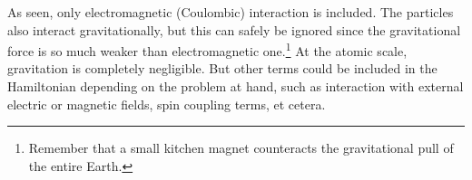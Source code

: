 \documentclass[11pt,bibliography=totoc,index=totoc]{scrbook}   %
\begin{document}
As seen, only electromagnetic (Coulombic) interaction is included. 
The particles also interact gravitationally, but this can safely be ignored since the gravitational force is so much weaker than electromagnetic one.\footnote{Remember that a small kitchen magnet counteracts the gravitational pull of the entire Earth.}
At the atomic scale, gravitation is completely negligible. 
But other terms could be included in the Hamiltonian depending on the problem at hand, 
such as interaction with external electric or magnetic fields, spin coupling terms, et cetera.


\end{document}
